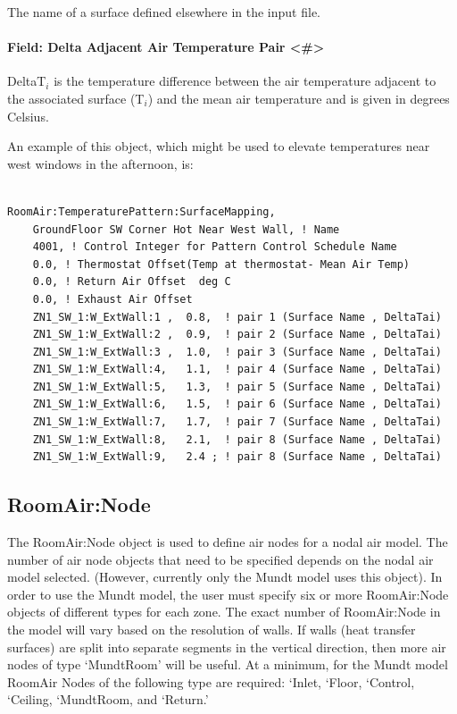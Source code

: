 The name of a surface defined elsewhere in the input file.

\paragraph{Field: Delta Adjacent Air Temperature Pair \textless{}\#\textgreater{}}\label{field-delta-adjacent-air-temperature-pair}

DeltaT\(_{i}\) is the temperature difference between the air temperature adjacent to the associated surface (T\(_{i}\)) and the mean air temperature and is given in degrees Celsius.

An example of this object, which might be used to elevate temperatures near west windows in the afternoon, is:

\begin{lstlisting}

RoomAir:TemperaturePattern:SurfaceMapping,
    GroundFloor SW Corner Hot Near West Wall, ! Name
    4001, ! Control Integer for Pattern Control Schedule Name
    0.0, ! Thermostat Offset(Temp at thermostat- Mean Air Temp)
    0.0, ! Return Air Offset  deg C
    0.0, ! Exhaust Air Offset
    ZN1_SW_1:W_ExtWall:1 ,  0.8,  ! pair 1 (Surface Name , DeltaTai)
    ZN1_SW_1:W_ExtWall:2 ,  0.9,  ! pair 2 (Surface Name , DeltaTai)
    ZN1_SW_1:W_ExtWall:3 ,  1.0,  ! pair 3 (Surface Name , DeltaTai)
    ZN1_SW_1:W_ExtWall:4,   1.1,  ! pair 4 (Surface Name , DeltaTai)
    ZN1_SW_1:W_ExtWall:5,   1.3,  ! pair 5 (Surface Name , DeltaTai)
    ZN1_SW_1:W_ExtWall:6,   1.5,  ! pair 6 (Surface Name , DeltaTai)
    ZN1_SW_1:W_ExtWall:7,   1.7,  ! pair 7 (Surface Name , DeltaTai)
    ZN1_SW_1:W_ExtWall:8,   2.1,  ! pair 8 (Surface Name , DeltaTai)
    ZN1_SW_1:W_ExtWall:9,   2.4 ; ! pair 8 (Surface Name , DeltaTai)
\end{lstlisting}

\subsection{RoomAir:Node}\label{roomairnode}

The RoomAir:Node object is used to define air nodes for a nodal air model. The number of air node objects that need to be specified depends on the nodal air model selected. (However, currently only the Mundt model uses this object). In order to use the Mundt model, the user must specify six or more RoomAir:Node objects of different types for each zone. The exact number of RoomAir:Node in the model will vary based on the resolution of walls. If walls (heat transfer surfaces) are split into separate segments in the vertical direction, then more air nodes of type `MundtRoom' will be useful. At a minimum, for the Mundt model RoomAir Nodes of the following type are required: `Inlet, `Floor, `Control, `Ceiling, `MundtRoom, and `Return.'

